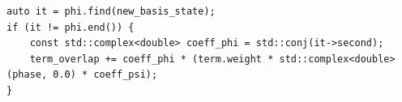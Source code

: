 \begin{verbatim}
auto it = phi.find(new_basis_state);
if (it != phi.end()) {
    const std::complex<double> coeff_phi = std::conj(it->second);
    term_overlap += coeff_phi * (term.weight * std::complex<double>(phase, 0.0) * coeff_psi);
}
\end{verbatim}





